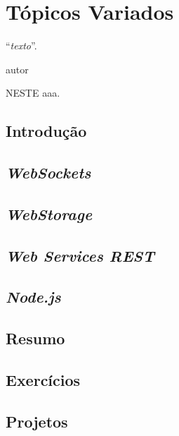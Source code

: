 \chapter{Tópicos Variados}\label{cap:topicosVariados}
\epigraph{``\textit{texto}''.}{autor}

\lettrine[lines=4, lhang=0.1, lraise=0, loversize=0.2, findent=0.1em]{\textcolor{corAzulTema}{N}}{ESTE} aaa.

\section{Introdução}

\section{\textit{WebSockets}}

\section{\textit{WebStorage}}

\section{\textit{Web Services REST}}

\section{\textit{Node.js}}

\section{Resumo}

\section{Exercícios}

\section{Projetos}
